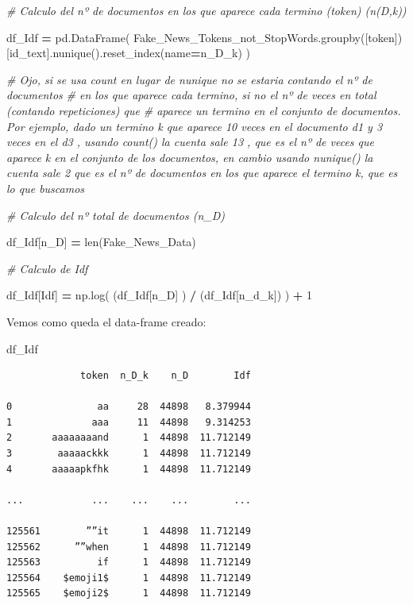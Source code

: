 \documentclass[
  11pt,
  a4paper,
]{article}
\newenvironment{Shaded}{\begin{snugshade}}{\end{snugshade}}
\newcommand{\BuiltInTok}[1]{#1}
\newcommand{\CommentTok}[1]{\textcolor[rgb]{0.56,0.35,0.01}{\textit{#1}}}
\newcommand{\DecValTok}[1]{\textcolor[rgb]{0.00,0.00,0.81}{#1}}
\newcommand{\NormalTok}[1]{#1}
\newcommand{\OperatorTok}[1]{\textcolor[rgb]{0.81,0.36,0.00}{\textbf{#1}}}
\newcommand{\StringTok}[1]{\textcolor[rgb]{0.31,0.60,0.02}{#1}}
\begin{document}
\begin{Shaded}
\begin{Highlighting}[]
\CommentTok{\# Calculo del nº de documentos en los que aparece cada termino (token) (n(D,k))}

\NormalTok{df\_Idf }\OperatorTok{=}\NormalTok{ pd.DataFrame( Fake\_News\_Tokens\_not\_StopWords.groupby([}\StringTok{\textquotesingle{}token\textquotesingle{}}\NormalTok{])[}\StringTok{\textquotesingle{}id\_text\textquotesingle{}}\NormalTok{].nunique().reset\_index(name}\OperatorTok{=}\StringTok{\textquotesingle{}n\_D\_k\textquotesingle{}}\NormalTok{) )}

\CommentTok{\# Ojo, si se usa count en lugar de nunique no se estaria contando el nº de documentos}
\CommentTok{\# en los que aparece cada termino, si no el nº de veces en total (contando repeticiones) que}
\CommentTok{\# aparece un termino en el conjunto de documentos. Por ejemplo, dado un termino k que aparece 10 veces en el documento d1 y 3 veces en el d3 , usando count() la cuenta sale 13 , que es el  nº de veces que aparece k en el conjunto de los documentos, en cambio usando nunique()  la cuenta sale 2 que es el nº de documentos en los que aparece el termino k, que es lo que buscamos}

\CommentTok{\# Calculo del nº total de documentos (n\_D)}

\NormalTok{df\_Idf[}\StringTok{\textquotesingle{}n\_D\textquotesingle{}}\NormalTok{] }\OperatorTok{=} \BuiltInTok{len}\NormalTok{(Fake\_News\_Data)}

\CommentTok{\# Calculo de Idf}

\NormalTok{df\_Idf[}\StringTok{\textquotesingle{}Idf\textquotesingle{}}\NormalTok{] }\OperatorTok{=}\NormalTok{ np.log( (df\_Idf[}\StringTok{\textquotesingle{}n\_D\textquotesingle{}}\NormalTok{] ) }\OperatorTok{/}\NormalTok{ (df\_Idf[}\StringTok{\textquotesingle{}n\_d\_k\textquotesingle{}}\NormalTok{]) ) }\OperatorTok{+} \DecValTok{1} 
\end{Highlighting}
\end{Shaded}

Vemos como queda el data-frame creado:

\begin{Shaded}
\begin{Highlighting}[]
\NormalTok{df\_Idf}
\end{Highlighting}
\end{Shaded}

\begin{verbatim}
             token  n_D_k    n_D        Idf
             
0               aa     28  44898   8.379944
1              aaa     11  44898   9.314253
2       aaaaaaaand      1  44898  11.712149
3        aaaaackkk      1  44898  11.712149
4       aaaaapkfhk      1  44898  11.712149

...            ...    ...    ...        ...

125561        ””it      1  44898  11.712149
125562      ””when      1  44898  11.712149
125563          if      1  44898  11.712149
125564    ️$emoji1$      1  44898  11.712149
125565    $emoji2$      1  44898  11.712149
\end{verbatim}
\end{document}
